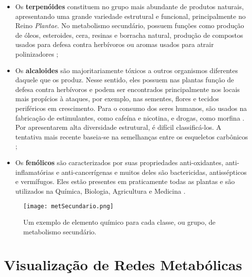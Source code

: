 \begin{itemize}
\item Os \textbf{terpenóides} constituem no grupo mais abundante de produtos naturais, apresentando uma grande variedade estrutural e funcional, principalmente no Reino \textit{Plantae}. No metabolismo secundário, possuem funções como produção de óleos, esteroides, cera, resinas e borracha natural, produção de compostos usados para defesa contra herbívoros ou aromas usados para atrair polinizadores \cite{Cap3schomburg};

\item Os \textbf{alcaloides} são majoritariamente tóxicos a outros organismos diferentes daquele que os produz. Nesse sentido, eles possuem nas plantas função de defesa contra herbívoros e podem ser encontrados principalmente nos locais mais propícios à ataques, por exemplo, nas sementes, flores e tecidos periféricos em crescimento. Para o consumo dos seres humanos, são usados na fabricação de estimulantes, como cafeína e nicotina, e drogas, como morfina \cite{Cap3schomburg}. Por apresentarem alta diversidade estrutural, é difícil classificá-los. A tentativa mais recente baseia-se na semelhanças entre os esqueletos carbônicos \cite{kabera14};

\item Os \textbf{fenólicos} são caracterizados por suas propriedades anti-oxidantes, anti-inflamatórias e anti-cancerígenas e muitos deles são bactericidas, antissépticos e vermífugos. Eles estão presentes em praticamente todas as plantas e são utilizados na Química, Biologia, Agricultura e Medicina \cite{kabera14}.
\end{itemize}

\begin{figure}[h]
    \centering
    \texttt{[image: metSecundario.png]}
    \caption{Um exemplo de elemento químico para cada classe, ou grupo, de metabolismo secundário.}
    \label{fig:metSecundario}
\end{figure} 


\section{Visualização de Redes Metabólicas} \label{BDredes}



